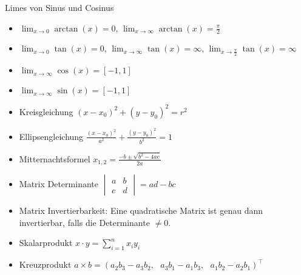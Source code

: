 \begin{Rechenregeln}{Limes von Sinus und Cosinus}{}
    \begin{itemize}
    \item $\lim_{x\to 0} \arctan(x) = 0$, $\lim_{x\to\infty} \arctan(x) = \frac{\pi}{2}$
    \item $\lim_{x\to 0} \tan(x) = 0$, $\lim_{x\to\infty} \tan(x) = \infty$, $\lim_{x\to\frac{\pi}{2}} \tan(x) = \infty$
    \item $\lim_{x\to\infty} \cos(x) = [-1, 1]$
    \item $\lim_{x\to\infty} \sin(x) = [-1, 1]$
    \end{itemize}
\end{Rechenregeln}

\begin{Diverses}{}{}
    \begin{itemize}
    \item Kreisgleichung $(x - x_0)^2 + (y - y_0)^2 = r^2$
    \item Ellipsengleichung $\frac{(x-x_0)^2}{a^2} + \frac{(y-y_0)^2}{b^2} = 1$
    \item Mitternachtsformel $x_{1, 2} = \frac{-b \pm \sqrt{b^2 - 4ac}}{2a}$
    \item Matrix Determinante $\begin{vmatrix}
        a & b\\
        c & d
    \end{vmatrix} = ad-bc$
    \item Matrix Invertierbarkeit: Eine quadratische Matrix ist genau dann invertierbar, falls die Determinante $\neq 0$.
    \item Skalarprodukt $x \cdot y = \sum_{i=1}^n x_i y_i$
    \item Kreuzprodukt $a \times b = (a_2b_3-a_3b_2, ~~~ a_3b_1-a_1b_3, ~~~ a_1b_2-a_2b_1)^\top$
    \end{itemize}
\end{Diverses}


